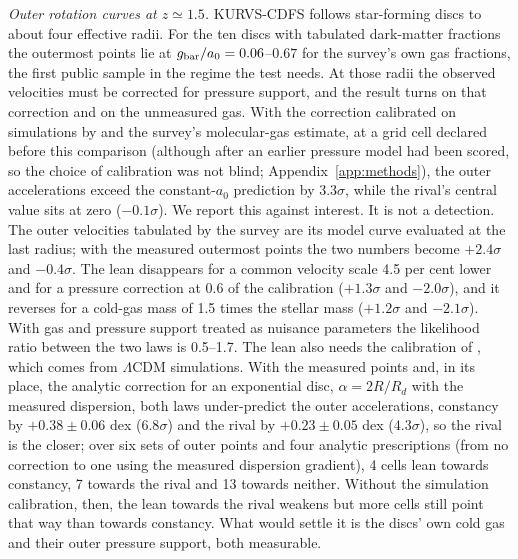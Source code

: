 \documentclass[fleqn,usenatbib]{mnras}
\begin{document}
\emph{Outer rotation curves at $z\simeq1.5$.} KURVS-CDFS \citep{Puglisi2023} follows star-forming discs to about four effective radii. For the ten discs with tabulated dark-matter fractions the outermost points lie at $g_{\rm bar}/a_0=0.06$--$0.67$ for the survey's own gas fractions, the first public sample in the regime the test needs. At those radii the observed velocities must be corrected for pressure support, and the result turns on that correction and on the unmeasured gas. With the correction calibrated on simulations by \citet{Kretschmer2021} and the survey's molecular-gas estimate, at a grid cell declared before this comparison (although after an earlier pressure model had been scored, so the choice of calibration was not blind; Appendix~\ref{app:methods}), the outer accelerations exceed the constant-$a_0$ prediction by $3.3\sigma$, while the rival's central value sits at zero ($-0.1\sigma$). We report this against interest. It is not a detection. The outer velocities tabulated by the survey are its model curve evaluated at the last radius; with the measured outermost points the two numbers become $+2.4\sigma$ and $-0.4\sigma$. The lean disappears for a common velocity scale 4.5 per cent lower and for a pressure correction at 0.6 of the calibration ($+1.3\sigma$ and $-2.0\sigma$), and it reverses for a cold-gas mass of 1.5 times the stellar mass ($+1.2\sigma$ and $-2.1\sigma$). With gas and pressure support treated as nuisance parameters the likelihood ratio between the two laws is 0.5--1.7. The lean also needs the calibration of \citet{Kretschmer2021}, which comes from $\Lambda$CDM simulations. With the measured points and, in its place, the analytic correction for an exponential disc, $\alpha=2R/R_d$ with the measured dispersion, both laws under-predict the outer accelerations, constancy by $+0.38\pm0.06$ dex ($6.8\sigma$) and the rival by $+0.23\pm0.05$ dex ($4.3\sigma$), so the rival is the closer; over six sets of outer points and four analytic prescriptions (from no correction to one using the measured dispersion gradient), 4 cells lean towards constancy, 7 towards the rival and 13 towards neither. Without the simulation calibration, then, the lean towards the rival weakens but more cells still point that way than towards constancy. What would settle it is the discs' own cold gas and their outer pressure support, both measurable.
\end{document}
